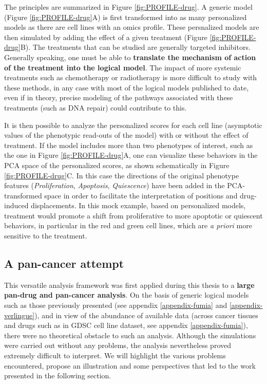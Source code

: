 \documentclass[a4paper,12pt,twoside,onecolumn,openright,final,oldfontcommands]{memoir}
\begin{document}
The principles are summarized in Figure \ref{fig:PROFILE-drug}. A
generic model (Figure \ref{fig:PROFILE-drug}A) is first transformed into
as many personalized models as there are cell lines with an omics
profile. These persnalized models are then simulated by adding the
effect of a given treatment (Figure \ref{fig:PROFILE-drug}B). The
treatments that can be studied are generally targeted inhibitors.
Generally speaking, one must be able to \textbf{translate the mechanism
of action of the treatment into the logical model}. The impact of more
systemic treatments such as chemotherapy or radiotherapy is more
difficult to study with these methods, in any case with most of the
logical models published to date, even if in theory, precise modeling of
the pathways associated with these treatments (such as DNA repair) could
contribute to this.

It is then possible to analyze the personalized scores for each cell
line (asymptotic values of the phenotypic read-outs of the model) with
or without the effect of treatment. If the model includes more than two
phenotypes of interest, such as the one in Figure
\ref{fig:PROFILE-drug}A, one can visualize these behaviors in the PCA
space of the personalized scores, as shown schematically in Figure
\ref{fig:PROFILE-drug}C. In this case the directions of the original
phenotype features (\emph{Proliferation}, \emph{Apoptosis},
\emph{Quiescence}) have been added in the PCA-transformed space in order
to facilitate the interpretation of positions and drug-induced
displacements. In this mock example, based on personalized models,
treatment would promote a shift from proliferative to more apoptotic or
quiescent behaviors, in particular in the red and green cell lines,
which are \emph{a priori} more sensitive to the treatment.

\subsection{A pan-cancer attempt}\label{a-pan-cancer-attempt}

This versatile analysis framework was first applied during this thesis
to a \textbf{large pan-drug and pan-cancer analysis}. On the basis of
generic logical models such as those previously presented (see appendix
\ref{appendix-fumia} and \ref{appendix-verlingue}), and in view of the
abundance of available data (across cancer tissues and drugs such as in
GDSC cell line dataset, see appendix \ref{appendix-fumia}), there were
no theoretical obstacle to such an analysis. Although the simulations
were carried out without any problems, the analysis nevertheless proved
extremely difficult to interpret. We will highlight the various problems
encountered, propose an illustration and some perspectives that led to
the work presented in the following section.
\end{document}
